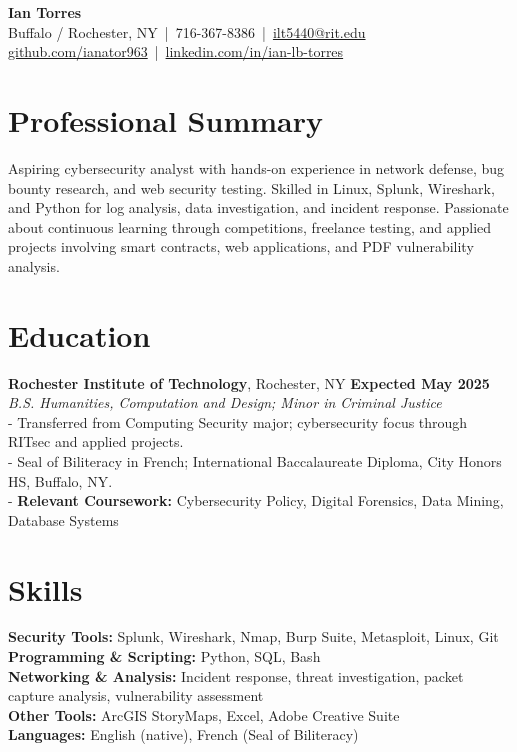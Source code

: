 \documentclass[11pt, letterpaper]{article}
\begin{document}
\begin{center}
{\Huge\bfseries Ian Torres} \\[2pt]
Buffalo / Rochester, NY \,|\, 716-367-8386 \,|\, \href{mailto:ilt5440@rit.edu}{ilt5440@rit.edu} \\[2pt]
\href{https://github.com/ianator963}{github.com/ianator963} \,|\, \href{https://www.linkedin.com/in/ian-lb-torres}{linkedin.com/in/ian-lb-torres}
\end{center}

\section*{Professional Summary}
Aspiring cybersecurity analyst with hands-on experience in network defense, bug bounty research, and web security testing. Skilled in Linux, Splunk, Wireshark, and Python for log analysis, data investigation, and incident response. Passionate about continuous learning through competitions, freelance testing, and applied projects involving smart contracts, web applications, and PDF vulnerability analysis.

\section*{Education}
\textbf{Rochester Institute of Technology}, Rochester, NY \hfill \textbf{Expected May 2025} \\
\textit{B.S. Humanities, Computation and Design; Minor in Criminal Justice} \\
- Transferred from Computing Security major; cybersecurity focus through RITsec and applied projects. \\
- Seal of Biliteracy in French; International Baccalaureate Diploma, City Honors HS, Buffalo, NY. \\
- \textbf{Relevant Coursework:} Cybersecurity Policy, Digital Forensics, Data Mining, Database Systems

\section*{Skills}
\textbf{Security Tools:} Splunk, Wireshark, Nmap, Burp Suite, Metasploit, Linux, Git \\
\textbf{Programming \& Scripting:} Python, SQL, Bash \\
\textbf{Networking \& Analysis:} Incident response, threat investigation, packet capture analysis, vulnerability assessment \\
\textbf{Other Tools:} ArcGIS StoryMaps, Excel, Adobe Creative Suite \\
\textbf{Languages:} English (native), French (Seal of Biliteracy)
\end{document}
